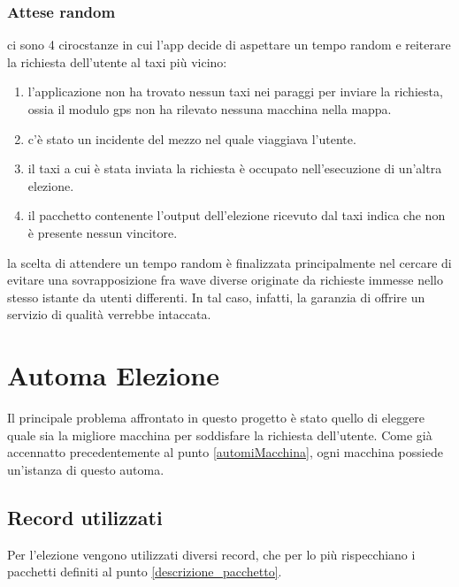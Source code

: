 \subsubsection{Attese random}
ci sono 4 cirocstanze in cui l'app decide di aspettare un tempo random e reiterare la richiesta dell'utente al taxi più vicino:
\begin{enumerate}
	\item l'applicazione non ha trovato nessun taxi nei paraggi per inviare la richiesta, ossia il modulo gps non ha rilevato nessuna macchina nella mappa.
	\item c'è stato un incidente del mezzo nel quale viaggiava l'utente.
	\item il taxi a cui è stata inviata la richiesta è occupato nell'esecuzione di un'altra elezione.
	\item il pacchetto contenente l'output dell'elezione ricevuto dal taxi indica che non è presente nessun vincitore.
\end{enumerate}

la scelta di attendere un tempo random è finalizzata principalmente nel cercare di evitare una sovrapposizione fra wave diverse originate da richieste immesse nello stesso istante da utenti differenti. In tal caso, infatti, la garanzia di offrire un servizio di qualità verrebbe intaccata.

\section{Automa Elezione}
Il principale problema affrontato in questo progetto è stato quello di eleggere quale sia la migliore macchina per soddisfare la richiesta dell'utente. Come già accennatto precedentemente al punto \ref{automiMacchina}, ogni macchina possiede un'istanza di questo automa.

\subsection{Record utilizzati}\label{record_elezione}
Per l'elezione vengono utilizzati diversi record, che per lo più rispecchiano i pacchetti definiti al punto \ref{descrizione_pacchetto}.

